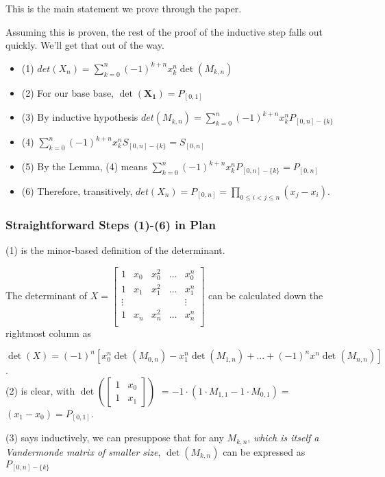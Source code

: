 \documentclass[11pt, oneside]{article} 	%
\begin{document}
This is the main statement we prove through the paper.

Assuming this is proven, the rest of the proof of the inductive step falls out quickly.  We'll get that out of the way.

\begin{itemize}
\item (1) $det(X_n) = \sum_{k=0}^n (-1)^{k+n} x_k^n\det(M_{k, n})$ 
\item (2) For our base base, $\det(\mathbf{X_1}) = P_{[0,1]}$
\item (3) By inductive hypothesis $det(M_{k,n}) = \sum_{k=0}^n (-1)^{k+n} x_k^n P_{[0,n] - \{k\}}$
\item (4) $\sum_{k=0}^n (-1)^{k+n}  x_k^n S_{[0,n] -\{k\}} = S_{[0, n]}$
\item (5) By the Lemma, (4) means $\sum_{k=0}^n (-1)^{k+n}  x_k^n P_{[0,n] -\{k\}} = P_{[0, n]}$
\item (6) Therefore, transitively, $det(X_n) = P_{[0, n]} = \prod_{0 \leq i < j \leq n}(x_j-x_i)$.
\end{itemize}

\subsubsection{Straightforward Steps (1)-(6) in Plan}

(1) is the minor-based definition of the determinant.

The determinant of 
 $X = \begin{bmatrix}
1 & x_0 & x_0^2 & \ldots & x_0^{n} \\
1 & x_1 & x_1^2 & \ldots & x_1^{n} \\
\vdots & & & & \vdots  \\
1 & x_{n} & x_{n}^2 & \ldots & x_{n}^{n} \\
\end{bmatrix}
$ can be calculated down the rightmost column as

$\det(X) = (-1)^n [ x_0^n \det(M_{0,n}) - x_1^n \det(M_{1,n}) +  ... + (-1)^n x^n \det(M_{n,n})]$.
\\

(2) is clear, with 
$\det(\begin{bmatrix} 1 & x_0 \\ 1& x_1 \end{bmatrix})$
$= -1\cdot(1\cdot M_{1, 1} - 1 \cdot M_{0,1}) = $
$(x_1 - x_0) = P_{[0,1]}$.

(3) says inductively, we can presuppose that  for any $M_{k, n}$, \emph{which is itself a Vandermonde matrix of smaller size}, $\det(M_{k,n})$ can be expressed as $P_{[0,n] - \{k\}}$
\end{document}
